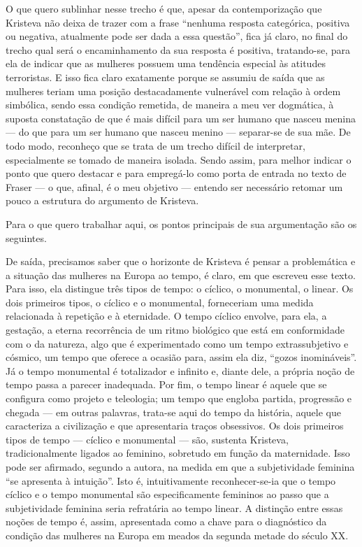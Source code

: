 O que quero sublinhar nesse trecho é que, apesar da contemporização que
Kristeva não deixa de trazer com a frase ``nenhuma resposta categórica,
positiva ou negativa, atualmente pode ser dada a essa questão'', fica já
claro, no final do trecho qual será o encaminhamento da sua resposta é
positiva, tratando-se, para ela de indicar que as mulheres possuem uma
tendência especial às atitudes terroristas. E isso fica claro exatamente
porque se assumiu de saída que as mulheres teriam uma posição
destacadamente vulnerável com relação à ordem simbólica, sendo essa
condição remetida, de maneira a meu ver dogmática, à suposta constatação
de que é mais difícil para um ser humano que nasceu menina --- do que
para um ser humano que nasceu menino --- separar-se de sua mãe. De todo
modo, reconheço que se trata de um trecho difícil de interpretar,
especialmente se tomado de maneira isolada. Sendo assim, para melhor
indicar o ponto que quero destacar e para empregá-lo como porta de
entrada no texto de Fraser --- o que, afinal, é o meu objetivo --- entendo
ser necessário retomar um pouco a estrutura do argumento de Kristeva.

Para o que quero trabalhar aqui, os pontos principais de sua
argumentação são os seguintes.

De saída, precisamos saber que o horizonte de Kristeva é pensar a
problemática e a situação das mulheres na Europa ao tempo, é claro, em
que escreveu esse texto. Para isso, ela distingue três tipos de tempo: o
cíclico, o monumental, o linear. Os dois primeiros tipos, o cíclico e o
monumental, forneceriam uma medida relacionada à repetição e à
eternidade. O tempo cíclico envolve, para ela, a gestação, a eterna
recorrência de um ritmo biológico que está em conformidade com o da
natureza, algo que é experimentado como um tempo extrassubjetivo e
cósmico, um tempo que oferece a ocasião para, assim ela diz, ``gozos
inomináveis''. Já o tempo monumental é totalizador e infinito e, diante
dele, a própria noção de tempo passa a parecer inadequada. Por fim, o
tempo linear é aquele que se configura como projeto e teleologia; um
tempo que engloba partida, progressão e chegada --- em outras palavras,
trata-se aqui do tempo da história, aquele que caracteriza a civilização
e que apresentaria traços obsessivos. Os dois primeiros tipos de tempo
--- cíclico e monumental --- são, sustenta Kristeva, tradicionalmente
ligados ao feminino, sobretudo em função da maternidade. Isso pode ser
afirmado, segundo a autora, na medida em que a subjetividade feminina
``se apresenta à intuição''. Isto é, intuitivamente reconhecer-se-ia que
o tempo cíclico e o tempo monumental são especificamente femininos ao
passo que a subjetividade feminina seria refratária ao tempo linear. A
distinção entre essas noções de tempo é, assim, apresentada como a chave
para o diagnóstico da condição das mulheres na Europa em meados da
segunda metade do século XX.

